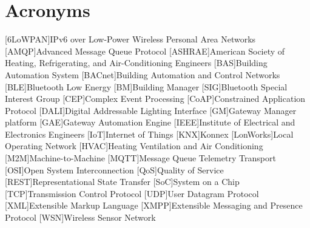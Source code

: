\chapter{Acronyms}

\footnotesize
\SingleSpacing

\begin{multicols}{2}
\begin{acronym}[AAAAAA]
	[6LoWPAN]{IPv6 over Low-Power Wireless Personal Area Networks}
	[AMQP]{Advanced Message Queue Protocol}
	[ASHRAE]{American Society of Heating, Refrigerating, and Air-Conditioning Engineers}
	[BAS]{Building Automation System}
	[BACnet]{Building Automation and Control Networks}
	[BLE]{Bluetooth Low Energy}
	[BM]{Building Manager}
	[SIG]{Bluetooth Special Interest Group}
	[CEP]{Complex Event Processing}
	[CoAP]{Constrained Application Protocol}
	[DALI]{Digital Addressable Lighting Interface}
	[GM]{Gateway Manager platform}
	[GAE]{Gateway Automation Engine}
	[IEEE]{Institute of Electrical and Electronics Engineers}
	[IoT]{Internet of Things}
	[KNX]{Konnex}
	[LonWorks]{Local Operating Network}
	[HVAC]{Heating Ventilation and Air Conditioning}
	[M2M]{Machine-to-Machine}
	[MQTT]{Message Queue Telemetry Transport}
	[OSI]{Open System Interconnection}
	[QoS]{Quality of Service}
	[REST]{Representational State Transfer}
	[SoC]{System on a Chip}
	[TCP]{Transmission Control Protocol}
	[UDP]{User Datagram Protocol}
	[XML]{Extensible Markup Language}
	[XMPP]{Extensible Messaging and Presence Protocol}
	[WSN]{Wireless Sensor Network}
	


\end{acronym}
\end{multicols}

